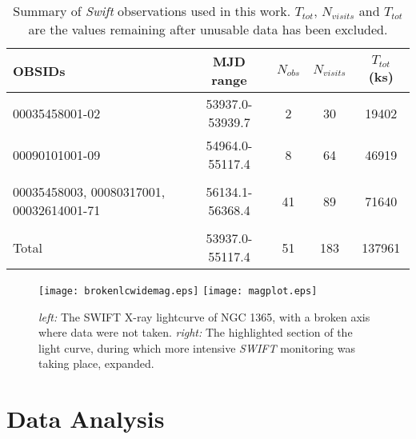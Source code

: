 \documentclass[useAMS,usenatbib]{sam}
\begin{document}
\begin{table}
 	\centering
	\begin{tabular}{| l | c | c | c | c |} \hline
		
	OBSIDs 							& MJD range 		& $N_{obs}$ 	& $N_{visits}$ 	& $T_{tot}$ (ks) 	\\ \hline \hline	
	

	00035458001-02						& 53937.0-53939.7	& 2		& 30		& 19402		\\ \hline
	00090101001-09						& 54964.0-55117.4	& 8		& 64 		& 46919		\\ \hline
	\multirow{3}{2.1cm}{00035458003, 00080317001, 00032614001-71} 	& 	&  		&  		& 		\\ 
								& 56134.1-56368.4	& 41		& 89		& 71640		\\
								&			&		&		&		\\ \hline
	
	Total							& 53937.0-55117.4	& 51		& 183		& 137961	\\ \hline

	\end{tabular}
		
	\caption{Summary of {\it Swift} observations used in this work. $T_{tot}$, $N_{visits}$ and $T_{tot}$  are the values remaining after unusable data has been
excluded.}
	\label{obstable}

\end{table}


\begin{figure*}
	\texttt{[image: brokenlcwidemag.eps]}
	\texttt{[image: magplot.eps]}
	\caption{{\it left:} The SWIFT X-ray lightcurve of NGC 1365, with a broken axis where data were not taken. {\it right:} The highlighted section of the light
curve, during which more intensive {\it SWIFT} monitoring was taking place, expanded.}
	\label{lc}
\end{figure*}

\section{Data Analysis}
\end{document}
